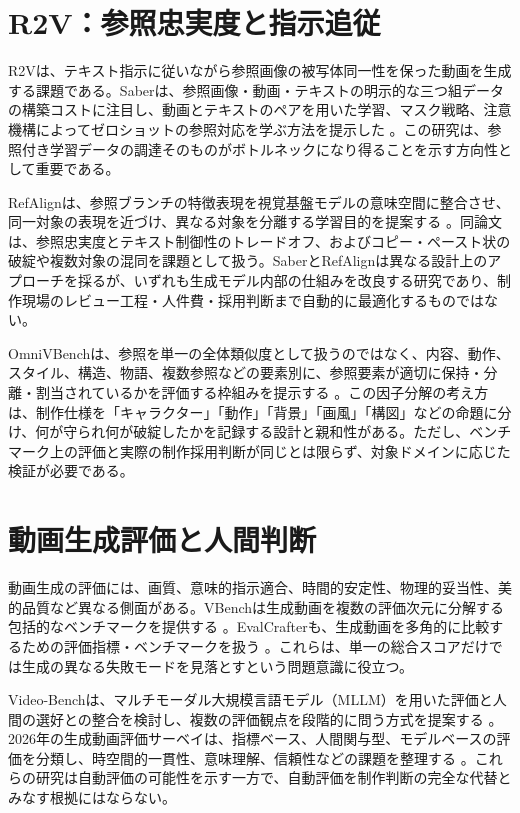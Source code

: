 \documentclass[11pt,a4paper]{article}
\begin{document}
\section{R2V：参照忠実度と指示追従}
R2Vは、テキスト指示に従いながら参照画像の被写体同一性を保った動画を生成する課題である。Saberは、参照画像・動画・テキストの明示的な三つ組データの構築コストに注目し、動画とテキストのペアを用いた学習、マスク戦略、注意機構によってゼロショットの参照対応を学ぶ方法を提示した \cite{zhou2025saber}。この研究は、参照付き学習データの調達そのものがボトルネックになり得ることを示す方向性として重要である。

RefAlignは、参照ブランチの特徴表現を視覚基盤モデルの意味空間に整合させ、同一対象の表現を近づけ、異なる対象を分離する学習目的を提案する \cite{wang2026refalign}。同論文は、参照忠実度とテキスト制御性のトレードオフ、およびコピー・ペースト状の破綻や複数対象の混同を課題として扱う。SaberとRefAlignは異なる設計上のアプローチを採るが、いずれも生成モデル内部の仕組みを改良する研究であり、制作現場のレビュー工程・人件費・採用判断まで自動的に最適化するものではない。

OmniVBenchは、参照を単一の全体類似度として扱うのではなく、内容、動作、スタイル、構造、物語、複数参照などの要素別に、参照要素が適切に保持・分離・割当されているかを評価する枠組みを提示する \cite{li2026omnivbench}。この因子分解の考え方は、制作仕様を「キャラクター」「動作」「背景」「画風」「構図」などの命題に分け、何が守られ何が破綻したかを記録する設計と親和性がある。ただし、ベンチマーク上の評価と実際の制作採用判断が同じとは限らず、対象ドメインに応じた検証が必要である。

\section{動画生成評価と人間判断}
動画生成の評価には、画質、意味的指示適合、時間的安定性、物理的妥当性、美的品質など異なる側面がある。VBenchは生成動画を複数の評価次元に分解する包括的なベンチマークを提供する \cite{huang2024vbench}。EvalCrafterも、生成動画を多角的に比較するための評価指標・ベンチマークを扱う \cite{liu2024evalcrafter}。これらは、単一の総合スコアだけでは生成の異なる失敗モードを見落とすという問題意識に役立つ。

Video-Benchは、マルチモーダル大規模言語モデル（MLLM）を用いた評価と人間の選好との整合を検討し、複数の評価観点を段階的に問う方式を提案する \cite{han2025videobench}。2026年の生成動画評価サーベイは、指標ベース、人間関与型、モデルベースの評価を分類し、時空間的一貫性、意味理解、信頼性などの課題を整理する \cite{safavigerdini2026survey}。これらの研究は自動評価の可能性を示す一方で、自動評価を制作判断の完全な代替とみなす根拠にはならない。
\end{document}
